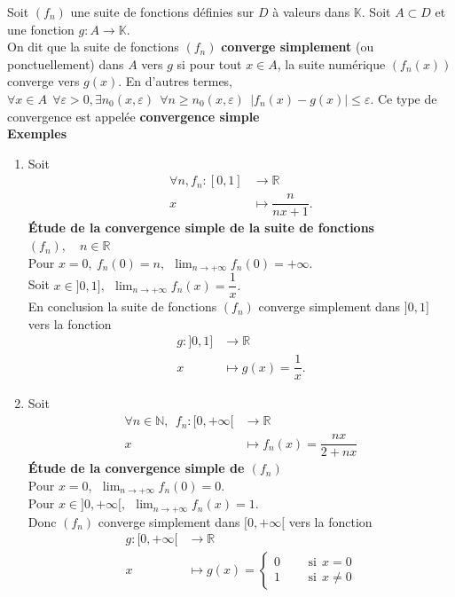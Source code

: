 \documentclass[11pt, a4paper]{book}
\begin{document}
Soit $(f_n)$ une suite de fonctions d\'efinies sur $D$ \`a valeurs dans $ \mathbb{K}$. Soit $A \subset D$ et une fonction $g:A\longrightarrow \mathbb{K}.$\\
On dit que la suite de fonctions $(f_n)$ \textbf{converge simplement} (ou ponctuellement) dans $A$ vers $g$ si pour tout $x\in A$, la suite num\'erique $(f_n(x))$ converge vers $g(x)$. En d'autres termes, $\forall x\in A ~~\forall \varepsilon>0, \exists n_0(x,\varepsilon) ~~\forall n\geq n_0(x,\varepsilon) ~~|f_n(x)-g(x)|\leq \varepsilon.$ Ce type de convergence est appel\'ee \textbf{convergence simple}\\
\textbf{Exemples}
\begin{enumerate}
\item Soit 
\begin{align*} \forall n, f_n:[0,1]&\longrightarrow \mathbb{R}\\ x&\longmapsto \dfrac{n}{nx+1}. 
\end{align*}
\textbf{\'Etude de la convergence simple de la suite de fonctions $(f_n),\quad n\in \mathbb{R}$ }\\
Pour $x=0,~f_n(0)=n,~~{\displaystyle \lim _{n\rightarrow +\infty}f_n(0)=+\infty.}$ \\
Soit $x\in ]0,1],~~{\displaystyle \lim_{n\rightarrow+\infty}f_n(x)=\dfrac{1}{x}.}$ \\
En conclusion la suite de fonctions $(f_n)$ converge simplement dans $]0,1]$ vers la fonction 
\begin{align*} g:]0,1]&\longrightarrow \mathbb{R}\\ x&\longmapsto g(x)=\dfrac{1}{x}.
\end{align*}
\item Soit\begin{align*} \forall n\in \mathbb{N},~~f_n:[0,+\infty[&\longrightarrow \mathbb{R}\\ x&\longmapsto f_n(x)=\dfrac{nx}{2+nx}
\end{align*}
\textbf{\'Etude de la convergence simple de  $(f_n)$}\\
Pour $x=0,~~{\displaystyle \lim_{n\rightarrow+\infty}f_n(0)=0.}$\\
Pour $x\in ]0,+\infty[,~~{\displaystyle \lim_{n\rightarrow+\infty}f_n(x)=1.}$\\
Donc $(f_n)$ converge simplement dans $[0,+\infty[$ vers la fonction  
\begin{align*} g:[0,+\infty[&\longrightarrow \mathbb{R}\\ x&\longmapsto g(x)= 
\begin{cases} 0 &\quad~~\text{si}~~x=0\\
1 &\quad~~\text{si}~~x\neq 0 
\end{cases} 
\end{align*}
\end{enumerate}
\end{document}

